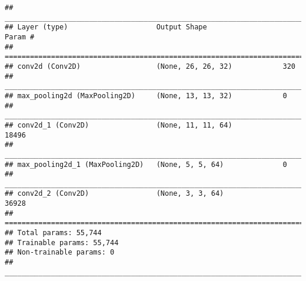 \documentclass[]{article}
\begin{document}
\begin{verbatim}
## ___________________________________________________________________________
## Layer (type)                     Output Shape                  Param #     
## ===========================================================================
## conv2d (Conv2D)                  (None, 26, 26, 32)            320         
## ___________________________________________________________________________
## max_pooling2d (MaxPooling2D)     (None, 13, 13, 32)            0           
## ___________________________________________________________________________
## conv2d_1 (Conv2D)                (None, 11, 11, 64)            18496       
## ___________________________________________________________________________
## max_pooling2d_1 (MaxPooling2D)   (None, 5, 5, 64)              0           
## ___________________________________________________________________________
## conv2d_2 (Conv2D)                (None, 3, 3, 64)              36928       
## ===========================================================================
## Total params: 55,744
## Trainable params: 55,744
## Non-trainable params: 0
## ___________________________________________________________________________
\end{verbatim}
\end{document}
